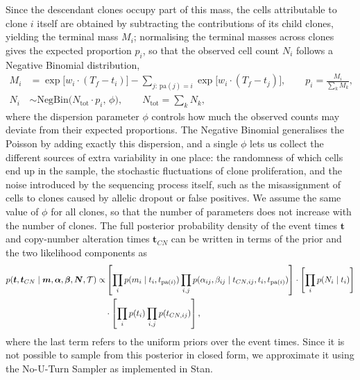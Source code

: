 Since the descendant clones occupy part of this mass, the cells attributable to clone $i$ itself are obtained by subtracting the contributions of its child clones, yielding the terminal mass $M_i$; normalising the terminal masses across clones gives the expected proportion $p_i$, so that the observed cell count $N_i$ follows a Negative
Binomial distribution,
%
\begin{equation}
\begin{split}
    M_i &= \exp\!\bigl[w_i \cdot (T_f - t_i)\bigr]
    - \!\!\sum_{j:\,\mathrm{pa}(j)=i}\!\! \exp\!\bigl[w_i \cdot (T_f - t_j)\bigr],
    \qquad p_i = \frac{M_i}{\sum_{k} M_k}, \\[4pt]
    N_i &\sim \mathrm{NegBin}\!\bigl(N_{\mathrm{tot}} \cdot p_i,\, \phi\bigr),
    \qquad N_{\mathrm{tot}} = \sum_{k} N_k,
\end{split}
\end{equation}
%
where the dispersion parameter $\phi$ controls how much the observed counts may
deviate from their expected proportions. The Negative Binomial generalises the
Poisson by adding exactly this dispersion, and a single $\phi$ lets us collect the
different sources of extra variability in one place: the randomness of which cells end
up in the sample, the stochastic fluctuations of clone proliferation, and the noise
introduced by the sequencing process itself, such as the misassignment of cells to
clones caused by allelic dropout or false positives. We assume the same value of
$\phi$ for all clones, so that the number of parameters does not increase with the
number of clones.
The full posterior probability density of the event times $\boldsymbol{t}$ and 
copy-number alteration times $\boldsymbol{t}_{CN}$ can be written in terms of the 
prior and the two likelihood components as
%
\begin{equation}
\begin{split}
    p(\boldsymbol{t}, \boldsymbol{t}_{CN} \mid \boldsymbol{m}, \boldsymbol{\alpha}, 
    \boldsymbol{\beta}, \boldsymbol{N}, \mathcal{T})
    \propto&
    \left[\prod_i p(m_i \mid t_i, t_{\mathrm{pa}(i)}) 
    \prod_{i,j} p(\alpha_{ij}, \beta_{ij} \mid t_{CN,ij}, t_i, t_{\mathrm{pa}(i)})\right]
    \cdot
    \left[\prod_i p(N_i \mid t_i)\right] \\
    \space &\cdot
    \left[\prod_i p(t_i) \prod_{i,j} p(t_{CN,ij})\right],
\end{split}
\end{equation}%
where the last term refers to the uniform priors over the event times. Since it is 
not possible to sample from this posterior in closed form, we approximate it using 
the No-U-Turn Sampler as implemented in Stan.

